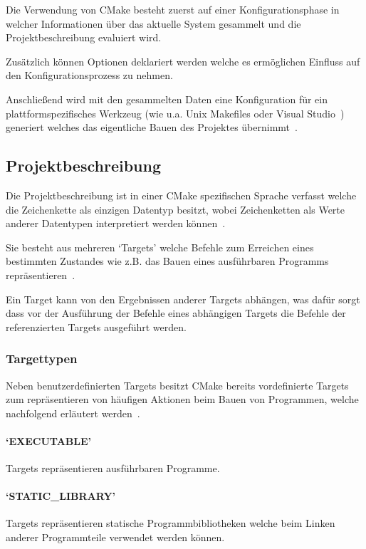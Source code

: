\documentclass[german,proseminar,hyperref,utf8]{zihpub}
\begin{document}
    Die Verwendung von CMake besteht zuerst auf einer Konfigurationsphase in welcher Informationen
    über das aktuelle System gesammelt und die Projektbeschreibung evaluiert wird.

    Zusätzlich können Optionen deklariert werden welche es ermöglichen Einfluss auf den
    Konfigurationsprozess zu nehmen.

    Anschlie{\ss}end wird mit den gesammelten Daten eine Konfiguration für ein plattformspezifisches Werkzeug
    (wie u.a. Unix Makefiles oder Visual Studio~)
    generiert welches das eigentliche Bauen des Projektes
    übernimmt~.

    \subsection{Projektbeschreibung}
    Die Projektbeschreibung ist in einer CMake spezifischen Sprache verfasst welche die Zeichenkette
    als einzigen Datentyp besitzt, wobei Zeichenketten als Werte anderer Datentypen interpretiert
    werden können~.

    Sie besteht aus mehreren `Targets' welche Befehle zum Erreichen eines bestimmten Zustandes wie
    z.B. das Bauen eines ausführbaren Programms repräsentieren~.

    Ein Target kann von den Ergebnissen anderer Targets abhängen, was dafür sorgt dass vor der
    Ausführung der Befehle eines abhängigen Targets die Befehle der referenzierten Targets ausgeführt werden.

    \subsubsection{Targettypen}
    Neben benutzerdefinierten Targets besitzt CMake bereits vordefinierte Targets zum repräsentieren
    von häufigen Aktionen beim Bauen von Programmen, welche nachfolgend erläutert
    werden~.

    \paragraph{`EXECUTABLE'} Targets repräsentieren ausführbaren Programme.

    \paragraph{`STATIC\_LIBRARY'} Targets repräsentieren statische Programmbibliotheken welche
    beim Linken anderer Programmteile verwendet werden können.
\end{document}
